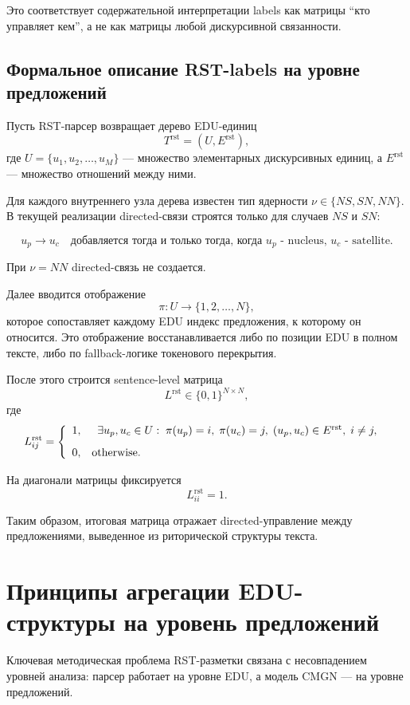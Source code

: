 \documentclass[12pt,a4paper]{article}
\begin{document}
Это соответствует содержательной интерпретации labels как матрицы ``кто управляет кем'',
а не как матрицы любой дискурсивной связанности.

\subsection{Формальное описание RST-labels на уровне предложений}

Пусть RST-парсер возвращает дерево EDU-единиц
\[
T^{\text{rst}} = (U, E^{\text{rst}}),
\]
где $U = \{u_1, u_2, \dots, u_M\}$ --- множество элементарных дискурсивных единиц, а
$E^{\text{rst}}$ --- множество отношений между ними.

Для каждого внутреннего узла дерева известен тип ядерности $\nu \in \{NS, SN, NN\}$.
В текущей реализации directed-связи строятся только для случаев $NS$ и $SN$:

\[
u_p \rightarrow u_c \quad \text{добавляется тогда и только тогда, когда } u_p
\text{ - nucleus, } u_c \text{ - satellite.}
\]

При $\nu = NN$ directed-связь не создается.

Далее вводится отображение
\[
\pi: U \rightarrow \{1,2,\dots,N\},
\]
которое сопоставляет каждому EDU индекс предложения, к которому он относится. Это
отображение восстанавливается либо по позиции EDU в полном тексте, либо по fallback-логике
токенового перекрытия.

После этого строится sentence-level матрица
\[
L^{\text{rst}} \in \{0,1\}^{N \times N},
\]
где
\[
L^{\text{rst}}_{ij} =
\left\{
\begin{array}{ll}
1, &
\begin{array}[t]{l}
\exists u_p, u_c \in U :\;
\pi(u_p) = i,\; \pi(u_c) = j,\; (u_p, u_c) \in E^{\text{rst}},\; i \neq j,
\end{array}
\\[8pt]
0, & \text{otherwise.}
\end{array}
\right.
\]


На диагонали матрицы фиксируется
\[
L^{\text{rst}}_{ii}=1.
\]

Таким образом, итоговая матрица отражает directed-управление между предложениями,
выведенное из риторической структуры текста.

\section{Принципы агрегации EDU-структуры на уровень предложений}

Ключевая методическая проблема RST-разметки связана с несовпадением уровней анализа:
парсер работает на уровне EDU, а модель CMGN --- на уровне предложений.
\end{document}
